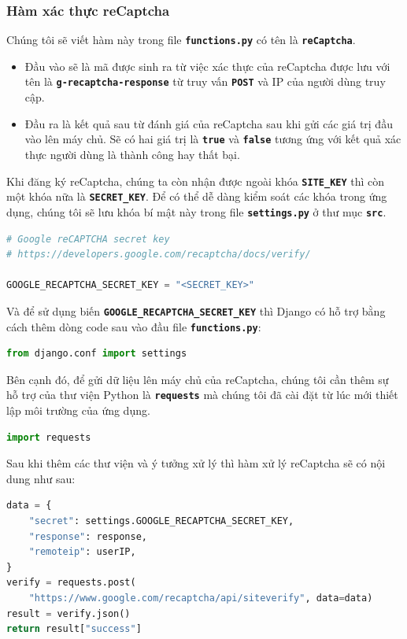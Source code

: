 \subsubsection{Hàm xác thực reCaptcha}
Chúng tôi sẽ viết hàm này trong file \textbf{\texttt{functions.py}} có tên là \textbf{\texttt{reCaptcha}}.
\begin{itemize}
    \item Đầu vào sẽ là mã được sinh ra từ việc xác thực của reCaptcha được lưu với tên là \textbf{\texttt{g-recaptcha-response}} từ truy vấn \textbf{\texttt{POST}} và IP của người dùng truy cập.
    \item Đầu ra là kết quả sau từ đánh giá của reCaptcha sau khi gửi các giá trị đầu vào lên máy chủ. Sẽ có hai giá trị là \textbf{\texttt{true}} và \textbf{\texttt{false}} tương ứng với kết quả xác thực người dùng là thành công hay thất bại.
\end{itemize}
\par
Khi đăng ký reCaptcha, chúng ta còn nhận được ngoài khóa \textbf{\texttt{SITE\_KEY}} thì còn một khóa nữa là \textbf{\texttt{SECRET\_KEY}}. Để có thể dễ dàng kiểm soát các khóa trong ứng dụng, chúng tôi sẽ lưu khóa bí mật này trong file \textbf{\texttt{settings.py}} ở thư mục \textbf{\texttt{src}}.
\begin{lstlisting}[language=Python]
# Google reCAPTCHA secret key
# https://developers.google.com/recaptcha/docs/verify/
    
GOOGLE_RECAPTCHA_SECRET_KEY = "<SECRET_KEY>"
\end{lstlisting}
\par
Và để sử dụng biến \textbf{\texttt{GOOGLE\_RECAPTCHA\_SECRET\_KEY}} thì Django có hỗ trợ bằng cách thêm dòng code sau vào đầu file \textbf{\texttt{functions.py}}:
\begin{lstlisting}[language=Python]
from django.conf import settings
\end{lstlisting}
\par
Bên cạnh đó, để gửi dữ liệu lên máy chủ của reCaptcha, chúng tôi cần thêm sự hỗ trợ của thư viện Python là \textbf{\texttt{requests}} mà chúng tôi đã cài đặt từ lúc mới thiết lập môi trường của ứng dụng.
\begin{lstlisting}[language=Python]
import requests
\end{lstlisting}
\par
Sau khi thêm các thư viện và ý tưởng xử lý thì hàm xử lý reCaptcha sẽ có nội dung như sau:
\begin{lstlisting}[language=Python]
data = {
    "secret": settings.GOOGLE_RECAPTCHA_SECRET_KEY,
    "response": response,
    "remoteip": userIP,
}
verify = requests.post(
    "https://www.google.com/recaptcha/api/siteverify", data=data)
result = verify.json()
return result["success"]
\end{lstlisting}
